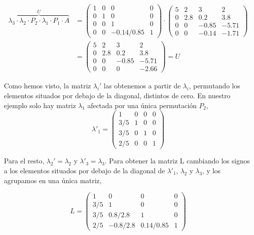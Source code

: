 \begin{align*}
\overbrace{\lambda_3\cdot\lambda_2\cdot P_2\cdot \lambda_1 \cdot P_1\cdot A}^{U}&=\begin{pmatrix}
1& 0& 0& 0\\
0& 1& 0& 0\\
0& 0& 1& 0\\
0& 0& -0.14/0.85&1
\end{pmatrix} \cdot \begin{pmatrix}
5& 2& 3& 2\\
0& 2.8& 0.2&3.8\\
0& 0& -0.85& -5.71\\
0& 0& -0.14& -1.71
\end{pmatrix}\\ 
&= \begin{pmatrix}
5& 2& 3& 2\\
0& 2.8& 0.2&3.8\\
0& 0& -0.85& -5.71\\
0& 0& 0& -2.66
\end{pmatrix}= U 
\end{align*}

Como hemos visto, la matriz $\lambda_i'$ las obtenemos a  partir de $\lambda_i$, permutando los elementos situados por debajo de la diagonal, distintos de cero. En nuestro ejemplo solo hay matriz $\lambda_1$ afectada por una única permutación $P_2$,
\begin{equation*}
\lambda'_1=\begin{pmatrix}
1& 0& 0& 0\\
3/5& 1& 0& 0\\
3/5& 0& 1& 0\\
2/5& 0& 0& 1
\end{pmatrix}
\end{equation*}

Para el resto, $\lambda_2'=\lambda_2$ y $\lambda'_3=\lambda_3$. Para obtener la matriz L cambiando los signos a los elementos situados por debajo de la diagonal de $\lambda'_1$, $\lambda_2$ y $\lambda_3$, y los agrupamos en una única matriz,

\begin{equation*}
L=\begin{pmatrix}
1& 0& 0& 0\\
3/5& 1& 0& 0\\
3/5& 0.8/2.8& 1& 0\\
2/5& -0.8/2.8& 0.14/0.85& 1
\end{pmatrix}
\end{equation*}


